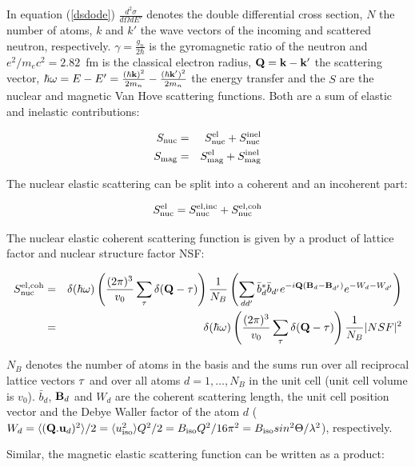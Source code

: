 In equation (\ref{dsdode}) $\frac{d^2\sigma}{d\Omega dE'}$ denotes the double differential
cross section, $N$ the number of atoms, $k$ and $k'$ the wave vectors of the incoming and
scattered neutron, respectively. $\gamma=\frac{g_n}{2\hbar}$ 
is the gyromagnetic ratio of the neutron and $e^2/m_ec^2=2.82$~fm is the classical
electron radius, $\mathbf Q=\mathbf k-\mathbf k'$ the scattering vector, 
$\hbar \omega=E-E'=\frac{(\hbar\mathbf k)^2}{2m_n}-\frac{(\hbar\mathbf k')^2}{2m_n}$
the energy transfer and the $S$ are the nuclear and magnetic Van Hove scattering functions.
Both are a sum of elastic and inelastic contributions:

\begin{eqnarray}
S_{\rm nuc}&=&S_{\rm nuc}^{\rm el}+S_{\rm nuc}^{\rm inel} \\
S_{\rm mag}&=&S_{\rm mag}^{\rm el}+S_{\rm mag}^{\rm inel}  
\end{eqnarray}

The nuclear elastic scattering can be split into a coherent and an 
incoherent part:

\begin{equation}
S_{\rm nuc}^{\rm el}=S_{\rm nuc}^{\rm el,inc}+S_{\rm nuc}^{\rm el,coh}
\end{equation}

The nuclear elastic coherent scattering function is given by a product
of lattice factor and nuclear structure factor NSF:

\begin{eqnarray}
S_{\rm nuc}^{\rm el,coh}&=&\delta(\hbar \omega) 
\left ( \frac{(2\pi)^3}{v_0}\sum_{\mbf \tau} \delta(\mbf Q-\mbf \tau) \right )
\frac{1}{N_B} \left ( \sum_{dd'} \bar b_d^* \bar b_{d'} e^{-i\mbf Q(\mbf B_d-\mbf B_{d'})} e^{-W_d-W_{d'}} %
\right )\\
&=&\delta(\hbar \omega)
\left ( \frac{(2\pi)^3}{v_0}\sum_{\mbf \tau} \delta(\mbf Q-\mbf \tau) \right )
\frac{1}{N_B}|NSF|^2
\end{eqnarray}

$N_B$ denotes the number of atoms in the basis and the sums run over
all reciprocal lattice vectors $\mathbf \tau$ and over all atoms $d=1,\dots,N_B$
in the unit cell (unit cell volume is $v_0$). 
$\bar b_d$, $\mathbf B_d$ and $W_d$ are the coherent scattering length, the unit cell
position vector and the Debye Waller factor of the atom $d$ 
($W_d= \langle (\mathbf Q.\mathbf u_d)^2 \rangle/2=\langle u_{\rm iso}^2 \rangle Q^2/2=B_{\rm iso}Q^2/16\pi^2=
B_{\rm iso} sin^2 \Theta / \lambda^2$), respectively. 

Similar, the magnetic elastic scattering function can be written as a product:

